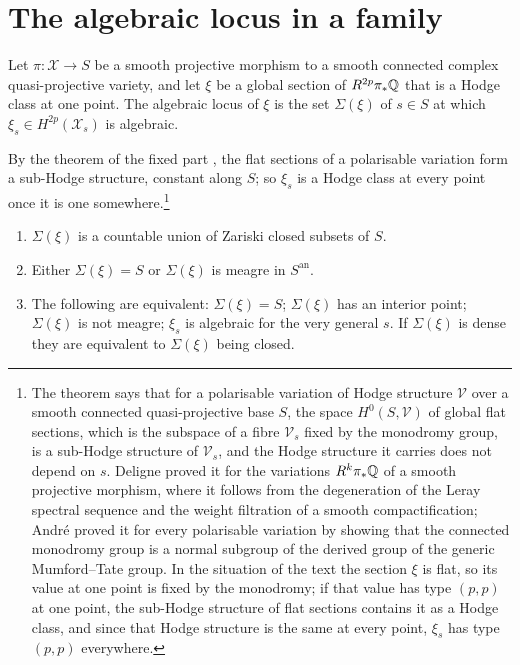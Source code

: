 \section{The algebraic locus in a family}\label{sec:loci}

\begin{definition}\label{def:algloc}
Let $\pi\colon\mathcal{X}\to S$ be a smooth projective morphism to a smooth connected complex quasi-projective variety, and let $\xi$ be a global section of $R^{2p}\pi_{*}\mathbb{Q}$ that is a Hodge class at one point. The algebraic locus of $\xi$ is the set $\Sigma(\xi)$ of $s\in S$ at which $\xi_{s}\in H^{2p}(\mathcal{X}_{s})$ is algebraic.
\end{definition}

By the theorem of the fixed part \cite{Del71,And92}, the flat sections of a polarisable variation form a sub-Hodge structure, constant along $S$; so $\xi_{s}$ is a Hodge class at every point once it is one somewhere.\footnote{The theorem says that for a polarisable variation of Hodge structure $\mathcal{V}$ over a smooth connected quasi-projective base $S$, the space $H^{0}(S,\mathcal{V})$ of global flat sections, which is the subspace of a fibre $\mathcal{V}_{s}$ fixed by the monodromy group, is a sub-Hodge structure of $\mathcal{V}_{s}$, and the Hodge structure it carries does not depend on $s$. Deligne proved it for the variations $R^{k}\pi_{*}\mathbb{Q}$ of a smooth projective morphism, where it follows from the degeneration of the Leray spectral sequence and the weight filtration of a smooth compactification; Andr\'e proved it for every polarisable variation by showing that the connected monodromy group is a normal subgroup of the derived group of the generic Mumford--Tate group. In the situation of the text the section $\xi$ is flat, so its value at one point is fixed by the monodromy; if that value has type $(p,p)$ at one point, the sub-Hodge structure of flat sections contains it as a Hodge class, and since that Hodge structure is the same at every point, $\xi_{s}$ has type $(p,p)$ everywhere.}

\begin{lemma}[Dichotomy]\label{lem:dichotomy}
\leavevmode
\begin{enumerate}[label=\textup{(\roman*)},leftmargin=2.4em,itemsep=2pt]
\item $\Sigma(\xi)$ is a countable union of Zariski closed subsets of $S$.
\item Either $\Sigma(\xi)=S$ or $\Sigma(\xi)$ is meagre in $S^{\mathrm{an}}$.
\item The following are equivalent: $\Sigma(\xi)=S$; $\Sigma(\xi)$ has an interior point; $\Sigma(\xi)$ is not meagre; $\xi_{s}$ is algebraic for the very general $s$. If $\Sigma(\xi)$ is dense they are equivalent to $\Sigma(\xi)$ being closed.
\end{enumerate}
\end{lemma}

